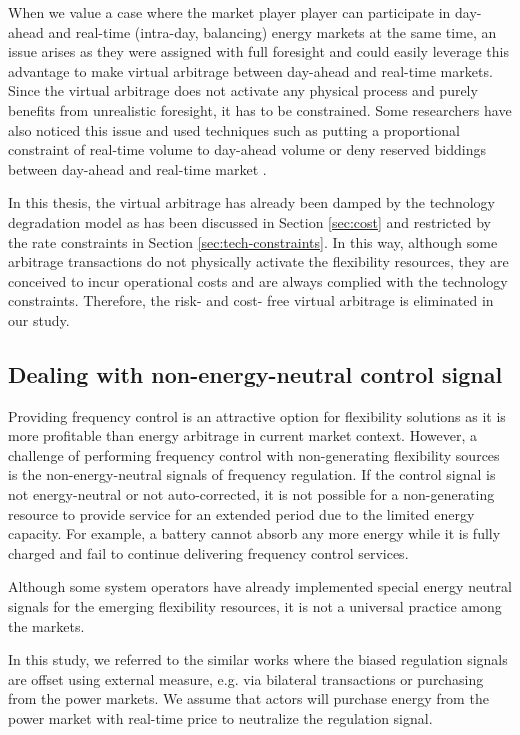 When we value a case where the market player player can participate in day-ahead and real-time (intra-day, balancing) energy markets at the same time, an issue arises as they were assigned with full foresight and could easily leverage this advantage to make virtual arbitrage between day-ahead and real-time markets. Since the virtual arbitrage does not activate any physical process and purely benefits from unrealistic foresight, it has to be constrained. Some researchers have also noticed this issue and used techniques such as putting a proportional constraint of real-time volume to day-ahead volume \cite{Han2017} or deny reserved biddings between day-ahead and real-time market \cite{Berrada2016}.

In this thesis, the virtual arbitrage has already been damped by the technology degradation model as has been discussed in Section \ref{sec:cost} and restricted by the rate constraints in Section \ref{sec:tech-constraints}. In this way, although some arbitrage transactions do not physically activate the flexibility resources, they are conceived to incur operational costs and are always complied with the technology constraints. Therefore, the risk- and cost- free virtual arbitrage is eliminated in our study.

\subsection{Dealing with non-energy-neutral control signal}
Providing frequency control is an attractive option for flexibility solutions as it is more profitable than energy arbitrage in current market context. However, a challenge of performing frequency control with non-generating flexibility sources is the non-energy-neutral signals of frequency regulation. If the control signal is not energy-neutral or not auto-corrected, it is not possible for a non-generating resource to provide service for an extended period due to the limited energy capacity. For example, a battery cannot absorb any more energy while it is fully charged and fail to continue delivering frequency control services.

Although some system operators have already implemented special energy neutral signals for the emerging flexibility resources, it is not a universal practice among the markets. 

In this study, we referred to the similar works \cite{Megel2017}\cite{Oudalov2007}\cite{Borsche2013}\cite{Jin2014} where the biased regulation signals are offset using external measure, e.g. via bilateral transactions or purchasing from the power markets. We assume that actors will purchase energy from the power market with real-time price to neutralize the regulation signal.

